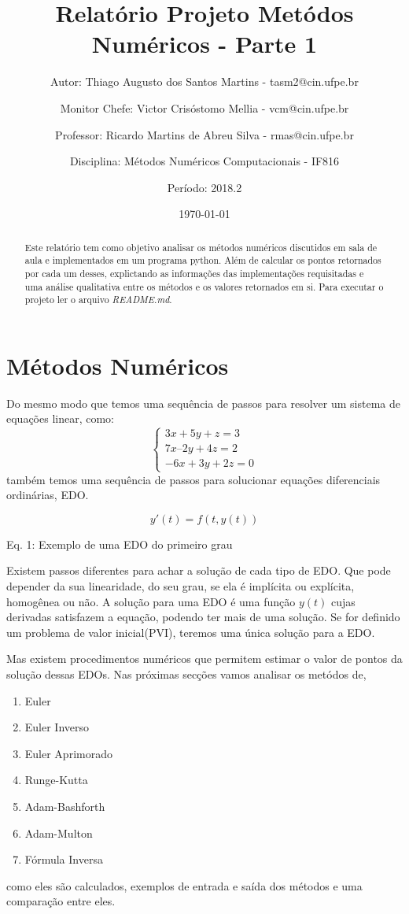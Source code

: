 \documentclass[a4paper]{article}
\title{Relatório Projeto Metódos Numéricos - Parte 1}
\author{
Autor: Thiago Augusto dos Santos Martins - tasm2@cin.ufpe.br
\and
Monitor Chefe: Victor Crisóstomo Mellia - vcm@cin.ufpe.br
\and
Professor: 	Ricardo Martins de Abreu Silva - rmas@cin.ufpe.br
\and
Disciplina: Métodos Numéricos Computacionais - IF816
\and
Período: 2018.2
}
\date{\today}
\begin{document}
\maketitle

\begin{abstract}
Este relatório tem como objetivo analisar os métodos numéricos discutidos em sala de aula e implementados em um programa python. Além de calcular os pontos retornados por cada um desses, explictando as informações das implementações requisitadas e uma análise qualitativa entre os métodos e os valores retornados em si. Para executar o projeto ler o arquivo \textit{README.md}.
\end{abstract}

\section{Métodos Numéricos}
\label{sec:introduction}
Do mesmo modo que temos uma sequência de passos para resolver um sistema de equações linear, como:
$$\begin{cases} 
3x + 5y + z = 3 \\ 7x – 2y + 4z = 2 \\ -6x + 3y + 2z = 0 
\end{cases}$$
também temos uma sequência de passos para solucionar equações diferenciais ordinárias, EDO. 

\begin{equation}
y'(t) = f(t, y(t))
\end{equation}
\centerline{Eq. 1: Exemplo de uma EDO do primeiro grau}
\smallskip\par

Existem passos diferentes para achar a solução de cada tipo de EDO. Que pode depender da sua linearidade, do seu grau, se ela é implícita ou explícita, homogênea ou não. A solução para uma EDO é uma função $y(t)$ cujas derivadas satisfazem a equação, podendo ter mais de uma solução. Se for definido um problema de valor inicial(PVI), teremos uma única solução para a EDO. \par
Mas existem procedimentos numéricos que permitem estimar o valor de pontos da solução dessas EDOs.
Nas próximas secções vamos analisar os metódos de,

\begin{center}
    \begin{minipage}{.4\textwidth}
        \begin{enumerate} 
            \item Euler 
            \item Euler Inverso 
            \item Euler Aprimorado 
            \item Runge-Kutta 
            \item Adam-Bashforth 
            \item Adam-Multon
            \item Fórmula Inversa
        \end{enumerate}
    \end{minipage}
\end{center}
como eles são calculados, exemplos de entrada e saída dos métodos e uma comparação entre eles.
\end{document}
